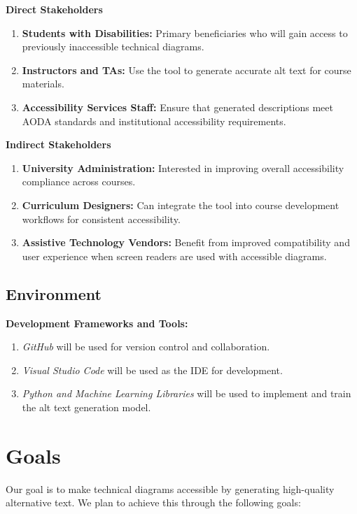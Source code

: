 \documentclass{article}
\begin{document}
\textbf{Direct Stakeholders}
\begin{enumerate}
    \item \textbf{Students with Disabilities:} Primary beneficiaries who will gain access to previously inaccessible technical diagrams. 
    \item \textbf{Instructors and TAs:} Use the tool to generate accurate alt text for course materials. 
    \item \textbf{Accessibility Services Staff:} Ensure that generated descriptions meet AODA standards and institutional accessibility requirements.
\end{enumerate}

\textbf{Indirect Stakeholders}
\begin{enumerate}
    \item \textbf{University Administration:} Interested in improving overall accessibility compliance across courses.
    \item \textbf{Curriculum Designers:} Can integrate the tool into course development workflows for consistent accessibility.
    \item \textbf{Assistive Technology Vendors:} Benefit from improved compatibility and user experience when screen readers are used with accessible diagrams.
\end{enumerate}

\subsection{Environment}


\textbf{Development Frameworks and Tools:}
\begin{enumerate}
    \item \textit{GitHub} will be used for version control and collaboration.
    \item \textit{Visual Studio Code} will be used as the IDE for development.
    \item \textit{Python and Machine Learning Libraries} will be used to implement and train the alt text generation model.
\end{enumerate}

\section{Goals}

Our goal is to make technical diagrams accessible by generating high-quality alternative text. 
We plan to achieve this through the following goals:
\end{document}
